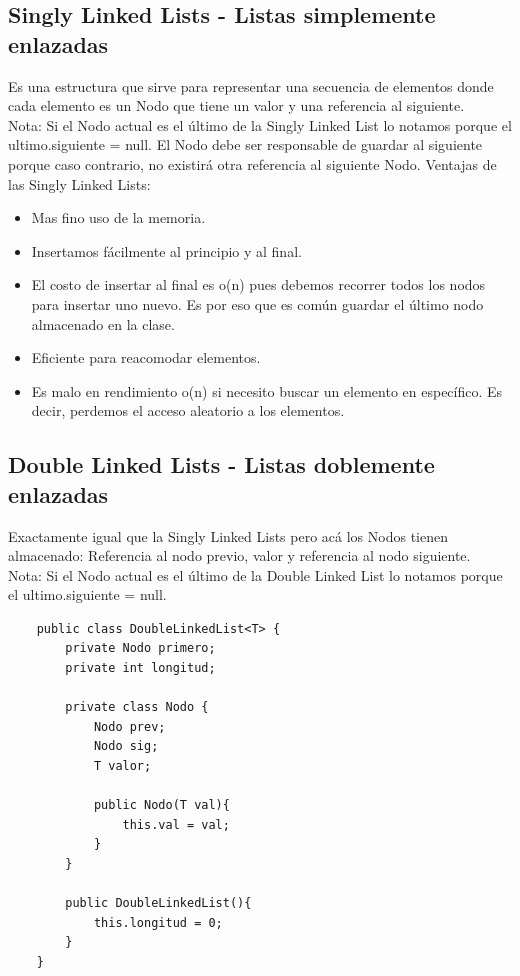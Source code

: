 \documentclass[10pt,a4paper]{article}
\begin{document}
\subsection*{Singly Linked Lists - Listas simplemente enlazadas}
Es una estructura que sirve para representar una secuencia de elementos donde cada elemento es un Nodo que tiene un valor y una referencia al siguiente. \\ 
Nota: Si el Nodo actual es el último de la Singly Linked List lo notamos porque el ultimo.siguiente = null.
El Nodo debe ser responsable de guardar al siguiente porque caso contrario, no existirá otra referencia al siguiente Nodo.
Ventajas de las Singly Linked Lists:
\begin{itemize}
    \item Mas fino uso de la memoria.
    \item Insertamos fácilmente al principio y al final.
    \item El costo de insertar al final es o(n) pues debemos recorrer todos los nodos para insertar uno nuevo. Es por eso que es común guardar el último nodo almacenado en la clase.
    \item Eficiente para reacomodar elementos.
    \item Es malo en rendimiento o(n) si necesito buscar un elemento en específico. Es decir, perdemos el acceso aleatorio a los elementos.
\end{itemize}
\subsection*{Double Linked Lists - Listas doblemente enlazadas}
Exactamente igual que la Singly Linked Lists pero acá los Nodos tienen almacenado: Referencia al nodo previo, valor y referencia al nodo siguiente. \\ 
Nota: Si el Nodo actual es el último de la Double Linked List lo notamos porque el ultimo.siguiente = null.
\begin{lstlisting}
    public class DoubleLinkedList<T> {
        private Nodo primero;
        private int longitud; 

        private class Nodo {
            Nodo prev;
            Nodo sig;
            T valor; 

            public Nodo(T val){
                this.val = val; 
            }
        }

        public DoubleLinkedList(){
            this.longitud = 0; 
        }
    }
\end{lstlisting}
\end{document}
